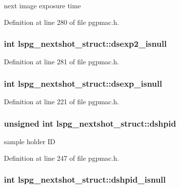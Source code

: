 next image exposure time 



Definition at line 280 of file pgpmac.\-h.

\hypertarget{structlspg__nextshot__struct_a45091283dc073e5b7da2cfbe5a75fade}{
\subsubsection[{dsexp2\-\_\-isnull}]{\setlength{\rightskip}{0pt plus 5cm}int lspg\-\_\-nextshot\-\_\-struct\-::dsexp2\-\_\-isnull}}\label{structlspg__nextshot__struct_a45091283dc073e5b7da2cfbe5a75fade}


Definition at line 281 of file pgpmac.\-h.

\hypertarget{structlspg__nextshot__struct_ae07498f62ea9c0e2f702b78c87500794}{
\subsubsection[{dsexp\-\_\-isnull}]{\setlength{\rightskip}{0pt plus 5cm}int lspg\-\_\-nextshot\-\_\-struct\-::dsexp\-\_\-isnull}}\label{structlspg__nextshot__struct_ae07498f62ea9c0e2f702b78c87500794}


Definition at line 221 of file pgpmac.\-h.

\hypertarget{structlspg__nextshot__struct_a5e260a420176f2973cdb100d0a5c4c09}{
\subsubsection[{dshpid}]{\setlength{\rightskip}{0pt plus 5cm}unsigned int lspg\-\_\-nextshot\-\_\-struct\-::dshpid}}\label{structlspg__nextshot__struct_a5e260a420176f2973cdb100d0a5c4c09}


sample holder I\-D 



Definition at line 247 of file pgpmac.\-h.

\hypertarget{structlspg__nextshot__struct_afe16be0382423aa3f25cb3d6cf99430b}{
\subsubsection[{dshpid\-\_\-isnull}]{\setlength{\rightskip}{0pt plus 5cm}int lspg\-\_\-nextshot\-\_\-struct\-::dshpid\-\_\-isnull}}\label{structlspg__nextshot__struct_afe16be0382423aa3f25cb3d6cf99430b}


